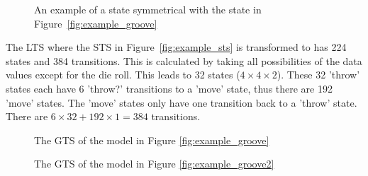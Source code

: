 \begin{figure}[h]
  \begin{center}
    
  \end{center}
  \caption{An example of a state symmetrical with the state in Figure~\ref{fig:example_groove}}
  \label{fig:symmetry_example}
\end{figure}

The LTS where the STS in Figure~\ref{fig:example_sts} is transformed to has 224 states and 384 transitions. This is calculated by taking all possibilities of the data values except for the die roll. This leads to 32 states ($4 \times 4 \times 2$). These 32 'throw' states each have 6 'throw?' transitions to a 'move' state, thus there are 192 'move' states. The 'move' states only have one transition back to a 'throw' state. There are $6 \times 32 + 192 \times 1 = 384$ transitions.

\begin{figure}[h]
  \begin{center}
    \resizebox{\textwidth}{!}{}
  \end{center}
  \caption{The GTS of the model in Figure \ref{fig:example_groove}}
  \label{fig:statespace_groove1}
\end{figure}

\begin{figure}[h!]
  \begin{center}
    \resizebox{\textwidth}{!}{}
  \end{center}
  \caption{The GTS of the model in Figure \ref{fig:example_groove2}}
  \label{fig:statespace_groove2}
\end{figure}
